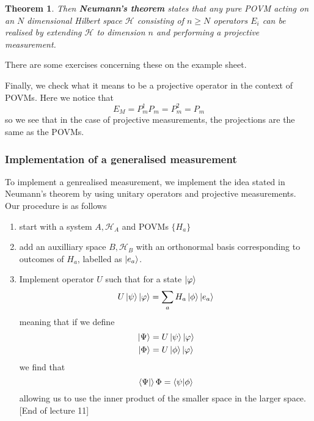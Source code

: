 \documentclass{article}
\newtheorem{theorem}{Theorem}
\theoremstyle{definition}
\begin{document}
\begin{theorem}
  Then \textbf{Neumann's theorem} states that any pure POVM acting on an $N$ 
  dimensional Hilbert space $\mathcal{H}$ consisting of $n \geq N$ operators 
  $E_i$ can be realised by extending $\mathcal{H}$ to dimension $n$ and
  performing a projective measurement.
\end{theorem}
There are some exercises concerning these on the example sheet.

Finally, we check what it means to be a projective operator in the context of 
POVMs. Here we notice that
\begin{equation}
  E_M = P_m^\dagger P_m = P_m^2 = P_m
\end{equation}
so we see that in the case of projective measurements, the projections are the 
same as the POVMs.

\subsubsection{Implementation of a generalised measurement}

To implement a genrealised measurement, we implement the idea stated in 
Neumann's theorem by using unitary operators and projective measurements.
Our procedure is as follows
\begin{enumerate}
  \item start with a system $A, \mathcal{H}_A$ and POVMs $\{H_a\}$
  \item add an auxilliary space $B, \mathcal{H}_B$ with an orthonormal basis
    corresponding to outcomes of $H_a$, labelled as $\ket{e_a}$.
  \item Implement operator $U$ such that for a state $\ket\varphi$ 
    \begin{equation}
      U \ket\psi \ket\varphi = \sum_a H_a \ket\phi \ket{e_a}
    \end{equation}
    meaning that if we define
    \begin{align}
      \ket\Psi &= U\ket\psi \ket\varphi \\
      \ket\Phi &= U\ket\phi \ket\varphi
    \end{align}
    we find that
    \begin{equation}
      \bra\Psi \ket\Phi = \bra\psi \ket{\phi}
    \end{equation}
    allowing us to use the inner product of the smaller space in the larger
    space. [End of lecture 11]
\end{enumerate}
\end{document}
